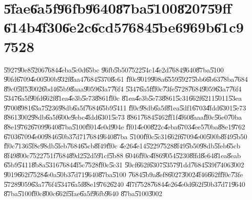                       

\part{\U{5fae}\U{6a5f}\U{96fb}\U{9640}\U{87ba}\U{5100}\U{8207}\U{59ff}%
\U{614b}\U{4f30}\U{6e2c}\U{6cd5}\U{7684}\U{5be6}\U{969b}\U{61c9}\U{7528}}

\setcounter{xpage}{1}\U{5927}\U{90e8}\U{5206}\U{7684}\U{4eba}\U{5c0d}\U{65bc}%
\U{96fb}\U{5b50}\U{7522}\U{54c1}\U{4e2d}\U{7684}\U{9640}\U{87ba}\U{5100}%
\U{90fd}\U{6709}\U{4e00}\U{500b}\U{932f}\U{8aa4}\U{7684}\U{5370}\U{8c61}%
\U{ff0c}\U{9019}\U{908a}\U{6559}\U{5927}\U{5bb6}\U{6b63}\U{78ba}\U{7684}%
\U{89c0}\U{5ff5}\U{3002}\U{6bd4}\U{65b9}\U{8aaa}\U{9059}\U{63a7}\U{76f4}%
\U{5347}\U{6a5f}\U{ff0c}\U{73fe}\U{5728}\U{7684}\U{9059}\U{63a7}\U{76f4}%
\U{5347}\U{6a5f}\U{90fd}\U{662f}\U{81ea}\U{4e3b}\U{5e73}\U{8861}\U{ff0c}%
\U{81ea}\U{4e3b}\U{5e73}\U{8861}\U{5c31}\U{662f}\U{6211}\U{5011}\U{53ea}%
\U{9700}\U{8981}\U{63a7}\U{5236}\U{98db}\U{6a5f}\U{7684}\U{65b9}\U{5411}%
\U{ff0c}\U{98db}\U{6a5f}\U{81ea}\U{5df1}\U{6703}\U{4fdd}\U{6301}\U{5e73}%
\U{8861}\U{3002}\U{98db}\U{6a5f}\U{600e}\U{9ebc}\U{4fdd}\U{6301}\U{5e73}%
\U{8861}\U{7684}\U{5462}\U{ff1f}\U{4f60}\U{8aaa}\U{ff0c}\U{56e0}\U{70ba}%
\U{88e1}\U{9762}\U{6709}\U{9640}\U{87ba}\U{5100}\U{ff01}\U{4e0d}\U{904e}%
\U{ff01}\U{4e00}\U{822c}\U{4eba}\U{6703}\U{4ee5}\U{70ba}\U{88e1}\U{9762}%
\U{6703}\U{6709}\U{4e00}\U{9846}\U{50b3}\U{7d71}\U{7684}\U{9640}\U{87ba}%
\U{5100}\U{ff0c}\U{5c31}\U{662f}\U{6709}\U{4e00}\U{500b}\U{8f49}\U{5b50}%
\U{ff0c}\U{7136}\U{5f8c}\U{98db}\U{5feb}\U{7684}\U{65cb}\U{8f49}\U{ff0c}%
\U{4e26}\U{4e14}\U{5229}\U{7528}\U{8f49}\U{5b50}\U{98db}\U{5feb}\U{65cb}%
\U{8f49}\U{800c}\U{7522}\U{751f}\U{7684}\U{89d2}\U{52d5}\U{91cf}\U{5b88}%
\U{6046}\U{ff0c}\U{4f86}\U{9054}\U{5230}\U{8ffd}\U{8e64}\U{81ea}\U{8eab}%
\U{65b9}\U{5411}\U{8b8a}\U{5316}\U{7684}\U{4f5c}\U{7528}\U{ff0c}\U{5c31}%
\U{50cf}\U{662f}\U{6307}\U{5357}\U{91dd}\U{7684}\U{539f}\U{7406}\U{3002}%
\U{9019}\U{662f}\U{7528}\U{4e0a}\U{50b3}\U{7d71}\U{9640}\U{87ba}\U{5100}%
\U{7684}\U{5b9a}\U{8ef8}\U{6027}\U{3002}\U{4f46}\U{662f}\U{ff0c}\U{73fe}%
\U{5728}\U{9059}\U{63a7}\U{76f4}\U{5347}\U{6a5f}\U{88e1}\U{9762}\U{6240}%
\U{4f7f}\U{7528}\U{7684}\U{4e26}\U{4e0d}\U{662f}\U{50b3}\U{7d71}\U{9640}%
\U{87ba}\U{5100}\U{ff0c}\U{800c}\U{662f}\U{5fae}\U{6a5f}\U{96fb}\U{9640}%
\U{87ba}\U{5100}\U{3002}

\bigskip

